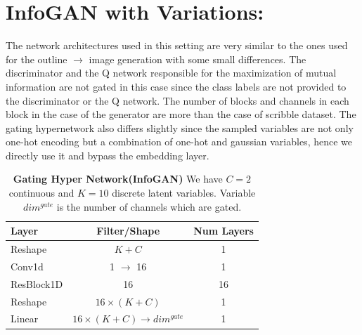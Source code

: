 \documentclass[10pt,twocolumn,letterpaper]{article}
\begin{document}
\section{InfoGAN with Variations:}
The network architectures used in this setting are very similar to the ones used for the outline $\rightarrow$ image generation with some small differences. The discriminator and the Q network responsible for the maximization of mutual information are not gated in this case since the class labels are not provided to the discriminator or the Q network. The number of blocks and channels in each block in the case of the generator are more than the case of scribble dataset. The gating hypernetwork also differs slightly since the sampled variables are not only one-hot encoding but a combination of one-hot and gaussian variables, hence we directly use it and bypass the embedding layer.

\begin{table}[ht]
\caption{\textbf{Gating Hyper Network(InfoGAN)}
We have $C=2$ continuous and $K=10$ discrete latent variables. Variable $dim^{gate}$ is the number of channels which are gated. }
\centering %
\begin{tabular}{l c c} %
\toprule%
\textbf{Layer} & \textbf{Filter/Shape} & \textbf{Num Layers} \\
\midrule
Reshape & $K+C$ & 1 \\
Conv1d & 1 $\rightarrow$ 16 & 1\\
ResBlock1D & 16 & 16\\
Reshape & $16\times (K+C)$ & 1\\
Linear & $16\times (K+C) \rightarrow dim^{gate} $& 1\\
\bottomrule%
\end{tabular}
\label{table:resnet_gating_infogan} %
\end{table}
\end{document}

